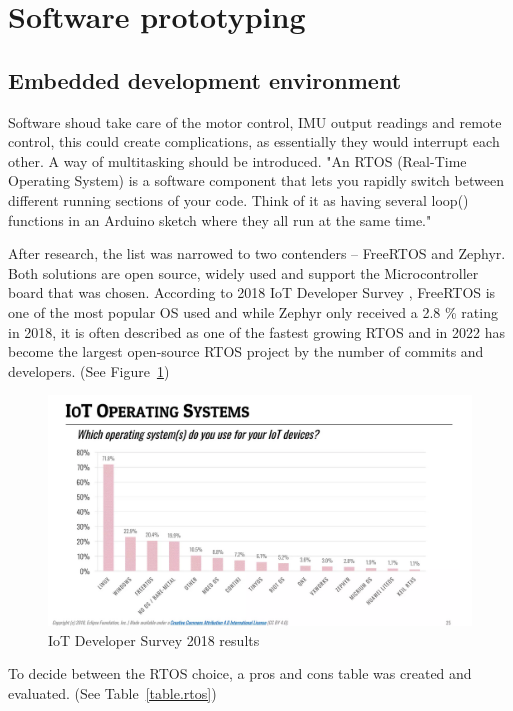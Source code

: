\section{Software prototyping}
\subsection{Embedded development environment}

Software shoud take care of the motor control, IMU output readings and remote control, this could create complications, as essentially they would interrupt each other. A way of multitasking should be introduced.
"An RTOS (Real-Time Operating System) is a software component that lets you rapidly switch between different running sections of your code. Think of it as having several loop() functions in an Arduino sketch where they all run at the same time." \cite{Joe2019}

After research, the list was narrowed to two contenders – FreeRTOS and Zephyr. Both solutions are open source, widely used and support the Microcontroller board that was chosen. \cite{Lemberg}
According to 2018 IoT Developer Survey \cite{IOT}, FreeRTOS is one of the most popular OS used and while Zephyr only received a 2.8 \% rating in 2018, it is often described as one of the fastest growing RTOS and in 2022 has become the largest open-source RTOS project by the number of commits and developers. (See Figure~\ref{fig:iot_os})
\begin{figure}[H]
    \centering
    \includegraphics[scale = 0.5]{pictures/iot_os.PNG}
    \caption{IoT Developer Survey 2018 results}
    \label{fig:iot_os}
\end{figure}

To decide between the RTOS choice, a pros and cons table was created and evaluated. \cite{Comparison} (See Table~\ref{table.rtos})

